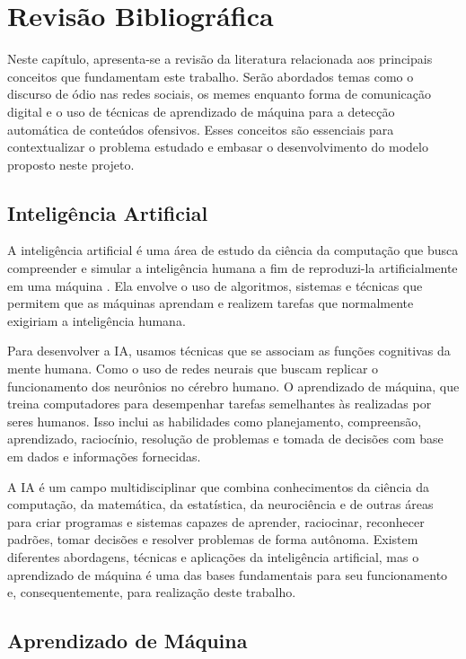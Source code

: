 \chapter{Revisão Bibliográfica}
\label{cap:02}

Neste capítulo, apresenta-se a revisão da literatura relacionada aos principais conceitos que fundamentam este trabalho. Serão abordados temas como o discurso de ódio nas redes sociais, os memes enquanto forma de comunicação digital e o uso de técnicas de aprendizado de máquina para a detecção automática de conteúdos ofensivos. Esses conceitos são essenciais para contextualizar o problema estudado e embasar o desenvolvimento do modelo proposto neste projeto.

\section{Inteligência Artificial}

A inteligência artificial é uma área de estudo da ciência da computação que busca compreender e simular a inteligência humana a fim de reproduzi-la artificialmente em uma máquina \cite{Haugeland1985}. Ela envolve o uso de algoritmos, sistemas e técnicas que permitem que as máquinas aprendam e realizem tarefas que normalmente exigiriam a inteligência humana.

Para desenvolver a IA, usamos técnicas que se associam as funções cognitivas da mente humana. Como o uso de redes neurais que buscam replicar o funcionamento dos neurônios no cérebro humano. O aprendizado de máquina, que treina computadores para desempenhar tarefas semelhantes às realizadas por seres humanos. Isso inclui as habilidades como planejamento, compreensão, aprendizado, raciocínio, resolução de problemas e tomada de decisões com base em dados e informações fornecidas.

A IA é um campo multidisciplinar que combina conhecimentos da ciência da computação, da matemática, da estatística, da neurociência e de outras áreas para criar programas e sistemas capazes de aprender, raciocinar, reconhecer padrões, tomar decisões e resolver problemas de forma autônoma. Existem diferentes abordagens, técnicas e aplicações da inteligência artificial, mas o aprendizado de máquina é uma das bases fundamentais para seu funcionamento e, consequentemente, para realização deste trabalho.

\section{Aprendizado de Máquina}

